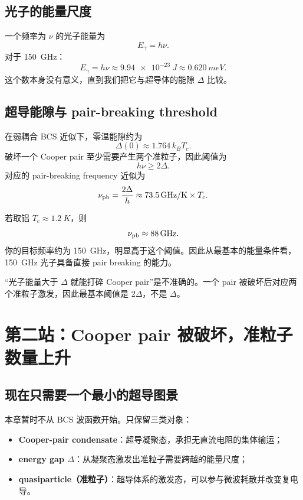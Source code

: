 \documentclass[11pt,a4paper,openany]{ctexrep}
\begin{document}
\subsection{光子的能量尺度}
一个频率为 $\nu$ 的光子能量为
\[
E_\gamma=h\nu.
\]
对于 \SI{150}{GHz}：
\[
E_\gamma = h\nu \approx \SI{9.94e-23}{J}\approx \SI{0.620}{meV}.
\]
这个数本身没有意义，直到我们把它与超导体的能隙 $\Delta$ 比较。

\subsection{超导能隙与 pair-breaking threshold}
在弱耦合 BCS 近似下，零温能隙约为
\[
\Delta(0)\approx1.764\,k_B T_c.
\]
破坏一个 Cooper pair 至少需要产生两个准粒子，因此阈值为
\[
\boxed{h\nu\ge 2\Delta.}
\]
对应的 pair-breaking frequency 近似为
\[
\nu_{\rm pb}=\frac{2\Delta}{h}\approx \SI{73.5}{GHz/K}\times T_c.
\]

\begin{projectbox}
若取铝 $T_c\approx\SI{1.2}{K}$，则
\[
\nu_{\rm pb}\approx\SI{88}{GHz}.
\]
你的目标频率约为 \SI{150}{GHz}，明显高于这个阈值。因此从最基本的能量条件看，\SI{150}{GHz} 光子具备直接 pair breaking 的能力。
\end{projectbox}

\begin{mistakebox}
“光子能量大于 $\Delta$ 就能打碎 Cooper pair”是不准确的。一个 pair 被破坏后对应两个准粒子激发，因此最基本阈值是 $2\Delta$，不是 $\Delta$。
\end{mistakebox}

\section{第二站：Cooper pair 被破坏，准粒子数量上升}

\subsection{现在只需要一个最小的超导图景}
本章暂时不从 BCS 波函数开始。只保留三类对象：
\begin{itemize}
  \item \textbf{Cooper-pair condensate}：超导凝聚态，承担无直流电阻的集体输运；
  \item \textbf{energy gap $\Delta$}：从凝聚态激发出准粒子需要跨越的能量尺度；
  \item \textbf{quasiparticle（准粒子）}：超导体系的激发态，可以参与微波耗散并改变复电导。
\end{itemize}
\end{document}
